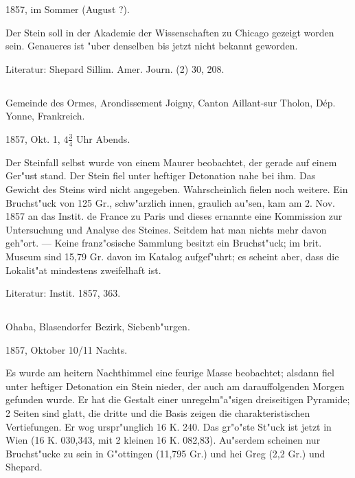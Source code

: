 \documentclass[a4paper, 11pt, oneside]{article}
\begin{document}
1857, im Sommer (August ?).

Der Stein soll in der Akademie der Wissenschaften zu Chicago gezeigt worden sein. Genaueres ist "uber denselben bis jetzt nicht bekannt geworden.

\normalsize
Literatur: Shepard Sillim. Amer. Journ. (2) 30, 208.

\subsection{}
\LARGE
\paragraph{}
Gemeinde des Ormes, Arondissement Joigny, Canton Aillant-sur Tholon, Dép. Yonne, Frankreich.

1857, Okt. 1, $\mathfrak{4\frac{3}{4}}$ Uhr Abends.

Der Steinfall selbst wurde von einem Maurer beobachtet, der gerade auf einem Ger"ust stand. Der Stein fiel unter heftiger Detonation nahe bei ihm. Das Gewicht des Steins wird nicht angegeben. Wahrscheinlich fielen noch weitere. Ein Bruchst"uck von 125 Gr., schw"arzlich innen, graulich au"sen, kam am 2. Nov. 1857 an das Instit. de France zu Paris und dieses ernannte eine Kommission zur Untersuchung und Analyse des Steines. Seitdem hat man nichts mehr davon geh"ort. --- Keine franz"osische Sammlung besitzt ein Bruchst"uck; im brit. Museum sind 15,79 Gr. davon im Katalog aufgef"uhrt; es scheint aber, dass die Lokalit"at mindestens zweifelhaft ist.

\normalsize
Literatur: Instit. 1857, 363.

\subsection{}
\LARGE
\paragraph{}
Ohaba, Blasendorfer Bezirk, Siebenb"urgen.

1857, Oktober 10/11 Nachts.

Es wurde am heitern Nachthimmel eine feurige Masse beobachtet; alsdann fiel unter heftiger Detonation ein Stein nieder, der auch am darauffolgenden Morgen gefunden wurde. Er hat die Gestalt einer unregelm"a"sigen dreiseitigen Pyramide; 2 Seiten sind glatt, die dritte und die Basis zeigen die charakteristischen Vertiefungen. Er wog urspr"unglich 16 K. 240. Das gr"o"ste St"uck ist jetzt in Wien (16 K. 030,343, mit 2 kleinen 16 K. 082,83). Au"serdem scheinen nur Bruchst"ucke zu sein in G"ottingen (11,795 Gr.) und hei Greg (2,2 Gr.) und Shepard.
\end{document}
